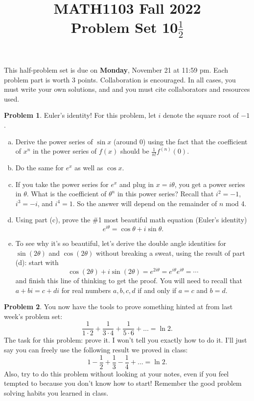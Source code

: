 \documentclass[11pt,oneside]{amsart}
\title{MATH1103 Fall 2022\\
Problem Set 10$\frac12$}
\theoremstyle{definition}
\newtheorem{problem}{Problem}
\theoremstyle{plain}
\begin{document}
\maketitle
This half-problem set is due on \textbf{Monday}, November 21 at 11:59 pm. Each problem part is worth 3 points. Collaboration is encouraged. In all cases, you must write your own solutions, and and you must cite collaborators and resources used.

\begin{problem}
Euler's identity! For this problem, let $i$ denote the square root of $-1$.
\leavevmode\begin{enumerate}[(a)]
  \item Derive the power series of $\sin x$ (around 0) using the fact that the coefficient of $x^n$ in the power series of $f(x)$ should be $\frac 1{n!}f^{(n)}(0)$.
  \item Do the same for $e^x$ as well as $\cos x$.
  \item If you take the power series for $e^x$ and plug in $x=i\theta$, you get a power series in $\theta$. What is the coefficient of $\theta^n$ in this power series? Recall that $i^2=-1$, $i^3=-i$, and $i^4=1$. So the answer will depend on the remainder of $n$ mod 4.
  \item Using part (c), prove the \#1 most beautiful math equation (Euler's identity)
        \[e^{i\theta}=\cos\theta+i\sin\theta.\]
  \item To see why it's so beautiful, let's derive the double angle identities for $\sin(2\theta)$ and $\cos(2\theta)$ without breaking a sweat, using the result of part (d): start with
        \[\cos(2\theta)+i\sin(2\theta)=e^{2i\theta}=e^{i\theta}e^{i\theta}=\cdots\]
        and finish this line of thinking to get the proof. You will need to recall that $a+bi=c+di$ for real numbers $a,b,c,d$ if and only if $a=c$ and $b=d$.
\end{enumerate}
\end{problem}

\begin{problem}
You now have the tools to prove something hinted at from last week's problem set:
\[\frac 1{1\cdot 2}+\frac 1{3\cdot 4}+\frac 1{5\cdot 6}+\dots=\ln 2.\]
The task for this problem: prove it. I won't tell you exactly how to do it. I'll just say you can freely use the following result we proved in class:
\[1-\frac12+\frac13-\frac 14+\dots=\ln 2.\]
Also, try to do this problem without looking at your notes, even if you feel tempted to because you don't know how to start! Remember the good problem solving habits you learned in class.
\end{problem}
\end{document}
